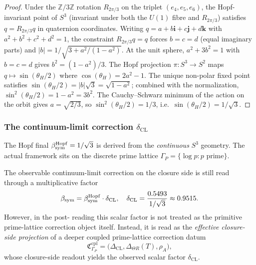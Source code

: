 \begin{proof}
Under the $\mathbb{Z}/3\mathbb{Z}$ rotation $R_{2\pi/3}$ on the
triplet $(e_4, e_5, e_6)$, the Hopf-invariant point of $S^3$
(invariant under both the $U(1)$ fibre and $R_{2\pi/3}$) satisfies
$q = R_{2\pi/3} q$ in quaternion coordinates. Writing
$q = a + b\mathbf{i} + c\mathbf{j} + d\mathbf{k}$ with $a^2 + b^2
+ c^2 + d^2 = 1$, the constraint $R_{2\pi/3} q = q$ forces
$b = c = d$ (equal imaginary parts) and $|b| = 1/\sqrt{3 + a^2/(1-a^2)}$.
At the unit sphere, $a^2 + 3b^2 = 1$ with $b = c = d$ gives
$b^2 = (1 - a^2)/3$. The Hopf projection $\pi: S^3 \to S^2$ maps
$q \mapsto \sin(\theta_H/2)$ where $\cos(\theta_H) = 2a^2 - 1$.
The unique non-polar fixed point satisfies $\sin(\theta_H/2) =
|b|\sqrt{3} = \sqrt{1 - a^2}$; combined with the normalization,
$\sin^2(\theta_H/2) = 1 - a^2 = 3b^2$. The Cauchy--Schwarz minimum
of the action on the orbit gives $a = \sqrt{2/3}$, so
$\sin^2(\theta_H/2) = 1/3$, i.e.\ $\sin(\theta_H/2) = 1/\sqrt{3}$.
\end{proof}

\subsubsection{The continuum-limit correction $\delta_{\mathrm{CL}}$}

The Hopf final $\beta_{\mathrm{sym}}^{\mathrm{Hopf}} = 1/\sqrt{3}$ is derived
from the \emph{continuous} $S^3$ geometry. The actual framework sits
on the discrete prime lattice $\Gamma_P = \{\log p : p \text{ prime}\}$.

\begin{proposition}
\label{prop:cl-shift}
The observable continuum-limit correction on the closure side is still
read through a multiplicative factor
\[
 \beta_{\mathrm{sym}} = \beta_{\mathrm{sym}}^{\mathrm{Hopf}} \cdot \delta_{\mathrm{CL}},
 \quad
 \delta_{\mathrm{CL}} = \frac{0.5493}{1/\sqrt{3}} \approx 0.9515.
\]
However, in the post- reading this scalar factor is not treated as
the primitive prime-lattice correction object itself. Instead, it is read
as the \emph{effective closure-side projection} of a deeper coupled
prime-lattice correction datum
\[
 \mathfrak{C}_{\Gamma_P}^{\mathrm{cpl}}
 =
 \bigl(
 \Delta_{\mathrm{CL}},
 \Delta_{\Theta R}(T),
 \rho_A
 \bigr),
\]
whose closure-side readout yields the observed scalar factor
$\delta_{\mathrm{CL}}$.
\end{proposition}

